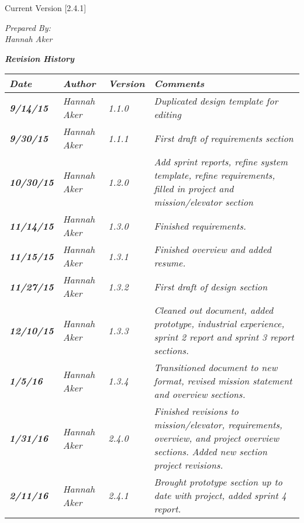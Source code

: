 


Current Version [2.4.1]
\vspace*{5mm}

{\color{SDColor5}
\noindent
\textit{Prepared By:}\\
\textit{Hannah Aker}
}

\vfill
\noindent
{ \textit{\textbf{Revision History}}}\\
\begin{tabular}{|>{\raggedright}p{1.5cm}|>{\raggedright}p{3cm}|>{\raggedright}p{1.5cm}|>{\raggedright}p{9cm}|}
\hline
\textit{\textbf{Date}} &  \textit{\textbf{Author}} & \textit{\textbf{Version}} & \textit{\textbf{Comments}}\tabularnewline
\hline
 \textit{\textbf{9/14/15}} & \textit{Hannah Aker} & \textit{1.1.0} & \textit{Duplicated design template for editing}\tabularnewline
\hline
 \textit{\textbf{9/30/15}} & \textit{Hannah Aker} & \textit{1.1.1} & \textit{First draft of requirements section}\tabularnewline
 \hline
  \textit{\textbf{10/30/15}} & \textit{Hannah Aker} & \textit{1.2.0} & \textit{Add sprint reports, refine system template, refine requirements, filled in project and mission/elevator section}\tabularnewline
\hline
 \textit{\textbf{11/14/15}} & \textit{Hannah Aker} & \textit{1.3.0} & \textit{Finished requirements.}\tabularnewline
\hline
 \textit{\textbf{11/15/15}} & \textit{Hannah Aker} & \textit{1.3.1} & \textit{Finished overview and added resume.}\tabularnewline
\hline
 \textit{\textbf{11/27/15}} & \textit{Hannah Aker} & \textit{1.3.2} & \textit{First draft of design section}\tabularnewline
\hline
 \textit{\textbf{12/10/15}} & \textit{Hannah Aker} & \textit{1.3.3} & \textit{Cleaned out document, added prototype, industrial experience, sprint 2 report and sprint 3 report sections.}\tabularnewline
\hline
 \textit{\textbf{1/5/16}} & \textit{Hannah Aker} & \textit{1.3.4} & \textit{Transitioned document to new format, revised mission statement and overview sections.}\tabularnewline
\hline
 \textit{\textbf{1/31/16}} & \textit{Hannah Aker} & \textit{2.4.0} & \textit{Finished revisions to mission/elevator, requirements, overview, and project overview sections. Added new section project revisions.}\tabularnewline
\hline
 \textit{\textbf{2/11/16}} & \textit{Hannah Aker} & \textit{2.4.1} & \textit{Brought prototype section up to date with project, added sprint 4 report.}\tabularnewline
\hline
\end{tabular}
\vfill


